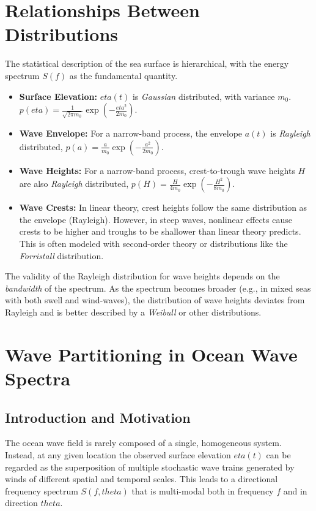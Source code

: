 \documentclass[journal,10pt,twocolumn]{IEEEtran}
\def\eta{eta}%
\def\theta{theta}%
\begin{document}
    \section{Relationships Between Distributions}

    The statistical description of the sea surface is hierarchical, with the energy spectrum $S(f)$ as the fundamental quantity.
    \begin{itemize}[leftmargin=1.4em]
        \item \textbf{Surface Elevation:} $\eta(t)$ is \textit{Gaussian} distributed, with variance $m_0$. $p(\eta) = \frac{1}{\sqrt{2\pi m_0}}\exp\left(-\frac{\eta^2}{2m_0}\right)$.
        \item \textbf{Wave Envelope:} For a narrow-band process, the envelope $a(t)$ is \textit{Rayleigh} distributed, $p(a) = \frac{a}{m_0}\exp\left(-\frac{a^2}{2m_0}\right)$.
        \item \textbf{Wave Heights:} For a narrow-band process, crest-to-trough wave heights $H$ are also \textit{Rayleigh} distributed, $p(H) = \frac{H}{4m_0}\exp\left(-\frac{H^2}{8m_0}\right)$.
        \item \textbf{Wave Crests:} In linear theory, crest heights follow the same distribution as the envelope (Rayleigh). However, in steep waves, nonlinear effects cause crests to be higher and troughs to be shallower than linear theory predicts. This is often modeled with second-order theory or distributions like the \textit{Forristall} distribution.
    \end{itemize}
    The validity of the Rayleigh distribution for wave heights depends on the \textit{bandwidth} of the spectrum. As the spectrum becomes broader (e.g., in mixed seas with both swell and wind-waves), the distribution of wave heights deviates from Rayleigh and is better described by a \textit{Weibull} or other distributions.

    \section{Wave Partitioning in Ocean Wave Spectra}
    \label{sec:wave-partitioning}

    \subsection{Introduction and Motivation}
    The ocean wave field is rarely composed of a single, homogeneous system. Instead, at any given location the observed surface elevation $\eta(t)$ can be regarded as the superposition of multiple stochastic wave trains generated by winds of different spatial and temporal scales. This leads to a directional frequency spectrum $S(f,\theta)$ that is multi-modal both in frequency $f$ and in direction $\theta$.
\end{document}
